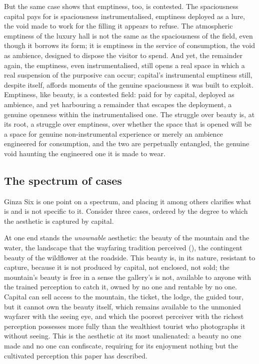 But the same case shows that emptiness, too, is contested. The spaciousness capital pays for is spaciousness instrumentalised, emptiness deployed as a lure, the void made to work for the filling it appears to refuse. The atmospheric emptiness of the luxury hall is not the same as the spaciousness of the field, even though it borrows its form; it is emptiness in the service of consumption, the void as ambience, designed to dispose the visitor to spend. And yet, the remainder again, the emptiness, even instrumentalised, still opens a real space in which a real suspension of the purposive can occur; capital's instrumental emptiness still, despite itself, affords moments of the genuine spaciousness it was built to exploit. Emptiness, like beauty, is a contested field: paid for by capital, deployed as ambience, and yet harbouring a remainder that escapes the deployment, a genuine openness within the instrumentalised one. The struggle over beauty is, at its root, a struggle over emptiness, over whether the space that is opened will be a space for genuine non-instrumental experience or merely an ambience engineered for consumption, and the two are perpetually entangled, the genuine void haunting the engineered one it is made to wear.

\subsection{The spectrum of cases}
\label{p21:sub:pe-spectrum}

Ginza Six is one point on a spectrum, and placing it among others clarifies what is and is not specific to it. Consider three cases, ordered by the degree to which the aesthetic is captured by capital.

At one end stands the \emph{unownable} aesthetic: the beauty of the mountain and the water, the landscape that the wayfaring tradition perceived (), the contingent beauty of the wildflower at the roadside. This beauty is, in its nature, resistant to capture, because it is not produced by capital, not enclosed, not sold; the mountain's beauty is free in a sense the gallery's is not, available to anyone with the trained perception to catch it, owned by no one and rentable by no one. Capital can sell access to the mountain, the ticket, the lodge, the guided tour, but it cannot own the beauty itself, which remains available to the unmonied wayfarer with the seeing eye, and which the poorest perceiver with the richest perception possesses more fully than the wealthiest tourist who photographs it without seeing. This is the aesthetic at its most unalienated: a beauty no one made and no one can confiscate, requiring for its enjoyment nothing but the cultivated perception this paper has described.

